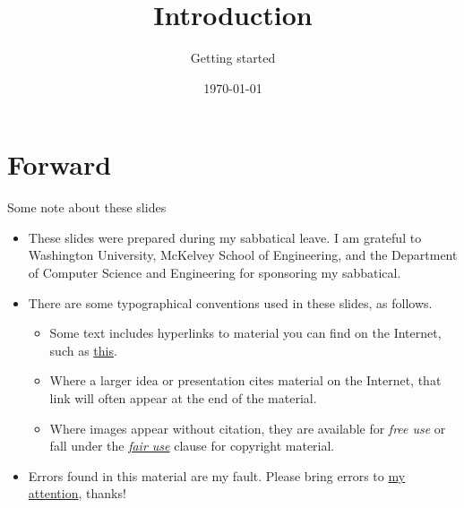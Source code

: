 
\title{Introduction}
\subtitle{Getting started}

\date{\today}

\begin{frame}
\maketitle
\end{frame}

\section{Forward}
\begin{frame}{Some note about these slides}
\begin{itemize}
    \item These slides were prepared during my sabbatical leave.  I am grateful to Washington University, McKelvey School of Engineering, and the Department of Computer Science and Engineering for sponsoring my sabbatical.
    \item There are some typographical conventions used in these slides, as follows.
    \begin{itemize}
        \item Some text includes hyperlinks to material you can find on the Internet, such as \href{https://en.wikipedia.org/wiki/Hyperlink}{this}.
        \item Where a larger idea or presentation cites material on the Internet, that link will often appear at the end of the material. 
        \item Where images appear without citation, they are available for \emph{free use} or fall under the \href{https://en.wikipedia.org/wiki/Fair_use}{\emph{fair use}} clause for copyright material. 
    \end{itemize}
    \item Errors found in this material are my fault.  Please bring errors to \href{mailto:cytron@wustl.edu}{my attention}, thanks!
\end{itemize}
\end{frame}
